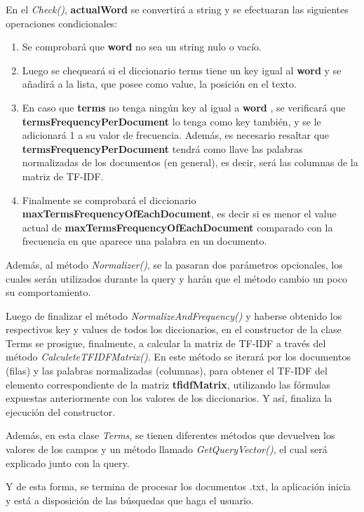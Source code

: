 \documentclass[a4paper,12pt]{report}
\begin{document}
En el \textit{Check()}, \textbf{actualWord} se convertirá a string y se efectuaran las siguientes operaciones
condicionales:

\begin{enumerate}
    \item Se comprobará que \textbf{word} no sea un string nulo o vacío.
    \item Luego se chequeará si el diccionario terms tiene un key igual al \textbf{word} y se añadirá a la lista, que posee
    como value, la posición en el texto.
    \item En caso que \textbf{terms} no tenga ningún key al igual a \textbf{word} , se verificará que \textbf{termsFrequencyPerDocument}
    lo tenga como key también, y se le adicionará 1 a su valor de frecuencia. Además, es necesario
    resaltar que \textbf{termsFrequencyPerDocument} tendrá como llave las palabras normalizadas de los
    documentos (en general), es decir, será las columnas de la matriz de TF-IDF.
    \item Finalmente se comprobará el diccionario \textbf{maxTermsFrequencyOfEachDocument}, es decir si es
    menor el value actual de \textbf{maxTermsFrequencyOfEachDocument} comparado con la frecuencia
    en que aparece una palabra en un documento.
\end{enumerate}

Además, al método \textit{Normalizer()}, se la pasaran dos parámetros opcionales, los cuales serán utilizados
durante la query y harán que el método cambio un poco su comportamiento.

Luego de finalizar el método \textit{NormalizeAndFrequency()} y haberse obtenido los respectivos key y
values de todos los diccionarios, en el constructor de la clase Terms se prosigue, finalmente, a calcular
la matriz de TF-IDF a través del método \textit{CalculeteTFIDFMatrix()}. En este método se iterará por los
documentos (filas) y las palabras normalizadas (columnas), para obtener el TF-IDF del elemento
correspondiente de la matriz \textbf{tfidfMatrix}, utilizando las fórmulas expuestas anteriormente con los
valores de los diccionarios. Y así, finaliza la ejecución del constructor.

Además, en esta clase \textit{Terms}, se tienen diferentes métodos que devuelven los valores de los campos
y un método llamado \textit{GetQueryVector()}, el cual será explicado junto con la query.

Y de esta forma, se termina de procesar los documentos .txt, la aplicación inicia y está a disposición
de las búsquedas que haga el usuario.
\end{document}
